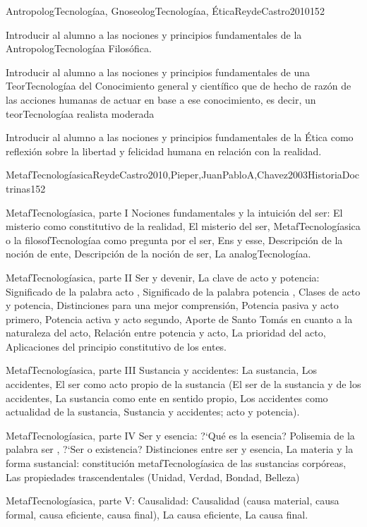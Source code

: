 \begin{syllabus}
\begin{unit}{AntropologTecnologíaa, GnoseologTecnologíaa, Ética}{ReydeCastro2010}{15}{2}
\begin{learningoutcomes}
	\item Introducir al alumno a las nociones y principios fundamentales de la AntropologTecnologíaa Filosófica.
	\item Introducir al alumno a las nociones y principios fundamentales de una TeorTecnologíaa del Conocimiento general y científico que de hecho de razón de las acciones humanas de actuar en base a ese conocimiento, es decir, un teorTecnologíaa realista moderada
	\item Introducir al alumno a las nociones y principios fundamentales de la Ética como reflexión sobre la libertad y felicidad humana en relación con la realidad.
\end{learningoutcomes}
\end{unit}

\begin{unit}{MetafTecnologíasica}{ReydeCastro2010,Pieper,JuanPabloA,Chavez2003HistoriaDoctrinas}{15}{2}
\begin{topics}
	\item MetafTecnologíasica, parte I  Nociones fundamentales y la intuición del ser: El misterio como constitutivo de la realidad, El misterio del ser, MetafTecnologíasica o la filosofTecnologíaa como pregunta por el ser, Ens y esse, Descripción de la noción de ente, Descripción de la noción de ser, La analogTecnologíaa.
	\item MetafTecnologíasica, parte II  Ser y devenir, La clave de acto y potencia: Significado de la palabra  acto , Significado de la palabra  potencia , Clases de acto y potencia, Distinciones para una mejor comprensión, Potencia pasiva y acto primero, Potencia activa y acto segundo, Aporte de Santo Tomás en cuanto a la naturaleza del acto, Relación entre potencia y acto, La prioridad del acto, Aplicaciones del principio constitutivo de los entes.
	\item MetafTecnologíasica, parte III  Sustancia y accidentes: La sustancia, Los accidentes, El ser como acto propio de la sustancia (El ser de la sustancia y de los accidentes, La sustancia como ente en sentido propio, Los accidentes como actualidad de la sustancia, Sustancia y accidentes; acto y potencia).
	\item MetafTecnologíasica, parte IV  Ser y esencia: ?`Qué es la esencia? Polisemia de la palabra  ser , ?`Ser o existencia? Distinciones entre ser y esencia, La materia y la forma sustancial: constitución metafTecnologíasica de las sustancias corpóreas, Las propiedades trascendentales (Unidad, Verdad, Bondad, Belleza)
	\item MetafTecnologíasica, parte V: Causalidad: Causalidad (causa material, causa formal, causa eficiente, causa final), La causa eficiente, La causa final.
\end{topics}


\end{unit}
\end{syllabus}
